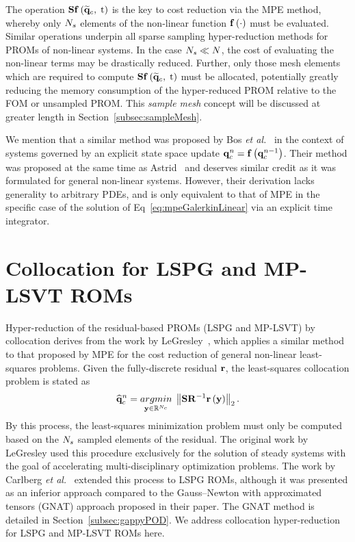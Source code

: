The operation $\mathbf{S} \mathbf{f} \left(\mathbf{\widetilde{q}}_{c}, \; \text{t}\right)$ is the key to cost reduction via the MPE method, whereby only $N_s$ elements of the non-linear function $\mathbf{f} \left(\cdot\right)$ must be evaluated. Similar operations underpin all sparse sampling hyper-reduction methods for PROMs of non-linear systems. In the case $N_s \ll N$, the cost of evaluating the non-linear terms may be drastically reduced. Further, only those mesh elements which are required to compute $\mathbf{S} \mathbf{f} \left(\mathbf{\widetilde{q}}_{c}, \; \text{t}\right)$ must be allocated, potentially greatly reducing the memory consumption of the hyper-reduced PROM relative to the FOM or unsampled PROM. This \textit{sample mesh} concept will be discussed at greater length in Section~\ref{subsec:sampleMesh}.

We mention that a similar method was proposed by Bos \textit{et al.}~\cite{Bos2004} in the context of systems governed by an explicit state space update $\mathbf{q}_{c}^{n} = \mathbf{f} \left(\mathbf{q}_{c}^{n - 1}\right)$. Their method was proposed at the same time as Astrid~\cite{Astrid2004} and deserves similar credit as it was formulated for general non-linear systems. However, their derivation lacks generality to arbitrary PDEs, and is only equivalent to that of MPE in the specific case of the solution of Eq~\ref{eq:mpeGalerkinLinear} via an explicit time integrator.

\section{Collocation for LSPG and MP-LSVT ROMs}

Hyper-reduction of the residual-based PROMs (LSPG and MP-LSVT) by collocation derives from the work by LeGresley~\cite{LeGresley2005}, which applies a similar method to that proposed by MPE for the cost reduction of general non-linear least-squares problems. Given the fully-discrete residual $\mathbf{r}$, the least-squares collocation problem is stated as
%
\begin{equation}\label{eq:collocLSPG}
	\consVecCoef^{\timeIdx} = \argmin{\dummyVec \inROne{\numConsModes}} \left\Vert \sampMat \resScaleInv \resFunc{\dummyVec} \right\Vert_2.
\end{equation}
%
By this process, the least-squares minimization problem must only be computed based on the $N_s$ sampled elements of the residual. The original work by LeGresley used this procedure exclusively for the solution of steady systems with the goal of accelerating multi-disciplinary optimization problems. The work by Carlberg \textit{et al.}~\cite{Carlberg2013} extended this process to LSPG ROMs, although it was presented as an inferior approach compared to the Gauss--Newton with approximated tensors (GNAT) approach proposed in their paper. The GNAT method is detailed in Section~\ref{subsec:gappyPOD}. We address collocation hyper-reduction for LSPG and MP-LSVT ROMs here.

